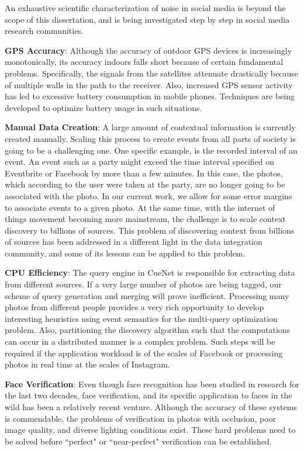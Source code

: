 An exhaustive scientific characterization of noise in social media is beyond the scope of this dissertation, and is being investigated step by step in social media research communities.

\textbf{\textbf{GPS Accuracy}}: Although the accuracy of outdoor GPS devices is increasingly monotonically, its accuracy indoors falls short because of certain fundamental problems. Specifically, the signals from the satellites attenuate drastically because of multiple walls in the path to the receiver. Also, increased GPS sensor activity has led to excessive battery consumption in mobile phones. Techniques are being developed to optimize battery usage in such situations.

\textbf{\textbf{Manual Data Creation}}: A large amount of contextual information is currently created manually. Scaling this process to create events from all parts of society is going to be a challenging one. One specific example, is the recorded interval of an event. An event such as a party might exceed the time interval specified on Eventbrite or Facebook by more than a few minutes. In this case, the photos, which according to the user were taken at the party, are no longer going to be associated with the photo. In our current work, we allow for some error margins to associate events to a given photo. At the same time, with the internet of things movement becoming more mainstream, the challenge is to scale context discovery to billions of sources. This problem of discovering context from billions of sources has been addressed in a different light in the data integration community, and some of its lessons can be applied to this problem.

\textbf{\textbf{CPU Efficiency}}: The query engine in CueNet is responsible for extracting data from different sources. If a very large number of photos are being tagged, our scheme of query generation and merging will prove inefficient. Processing many photos from different people provides a very rich opportunity to develop interesting heuristics using event semantics for the multi-query optimization problem. Also, partitioning the discovery algorithm such that the computations can occur in a distributed manner is a complex problem. Such steps will be required if the application workload is of the scales of Facebook or processing photos in real time at the scales of Instagram.

\textbf{\textbf{Face Verification}}: Even though face recognition has been studied in research for the last two decades, face verification, and its specific application to faces in the wild has been a relatively recent venture. Although the accuracy of these systems is commendable, the problems of verification in photos with occlusion, poor image quality, and diverse lighting conditions exist. These hard problems need to be solved before ``perfect" or ``near-perfect" verification can be established. 

